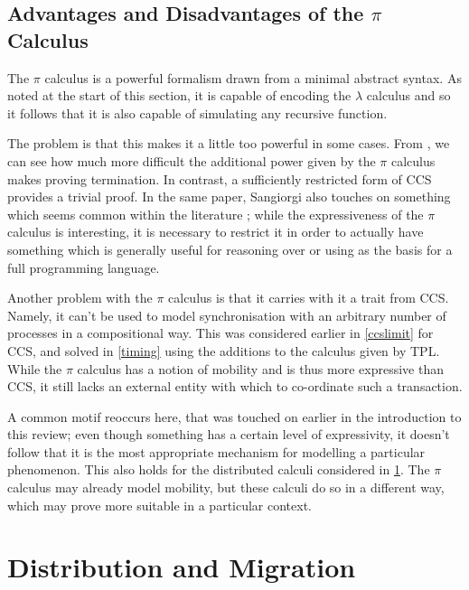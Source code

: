 \subsection{Advantages and Disadvantages of the $\pi$ Calculus}

The $\pi$ calculus is a powerful formalism drawn from a minimal
abstract syntax.  As noted at the start of this section, it is capable
of encoding the $\lambda$ calculus and so it follows that it is also
capable of simulating any recursive function.

The problem is that this makes it a little too powerful in some cases.
From \cite{sangiorgi:types-or}, we can see how much more difficult the
additional power given by the $\pi$ calculus makes proving
termination.  In contrast, a sufficiently restricted form of CCS
provides a trivial proof.  In the same paper, Sangiorgi also touches
on something which seems common within the literature
\cite{join,failure2,wojciechowski:phd,stefani:kells}; while the
expressiveness of the $\pi$ calculus is interesting, it is necessary
to restrict it in order to actually have something which is generally
useful for reasoning over or using as the basis for a full programming
language.

Another problem with the $\pi$ calculus is that it carries with it a
trait from CCS.  Namely, it can't be used to model synchronisation
with an arbitrary number of processes in a compositional way.  This
was considered earlier in \ref{ccslimit} for CCS, and solved in
\ref{timing} using the additions to the calculus given by TPL.  While
the $\pi$ calculus has a notion of mobility and is thus more
expressive than CCS, it still lacks an external entity with which to
co-ordinate such a transaction.  

A common motif reoccurs here, that was touched on earlier in the
introduction to this review; even though something has a certain level
of expressivity, it doesn't follow that it is the most appropriate
mechanism for modelling a particular phenomenon.  This also holds for
the distributed calculi considered in \ref{migration}.  The $\pi$
calculus may already model mobility, but these calculi do so in a
different way, which may prove more suitable in a particular context.
 
\section{Distribution and Migration}
\label{migration}

